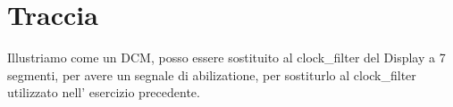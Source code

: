 %

\section{Traccia}

Illustriamo come un DCM, posso essere sostituito al clock\_filter
del Display a 7 segmenti, per avere un segnale di abilizatione, per
sostiturlo al clock\_filter utilizzato nell' esercizio precedente.%

